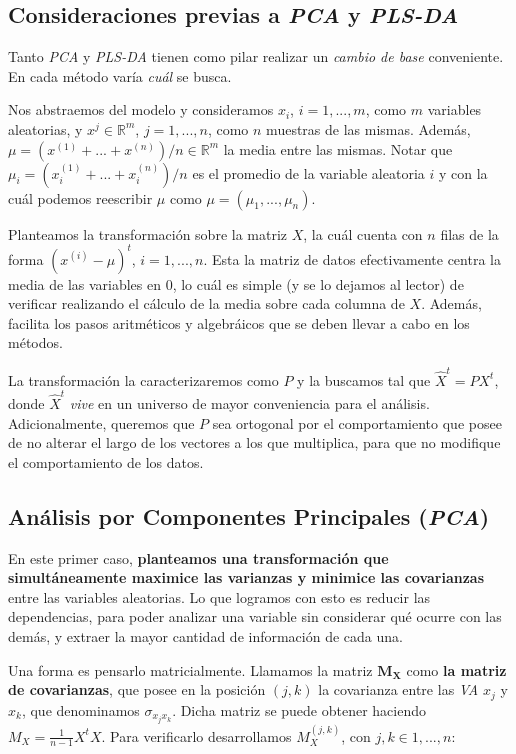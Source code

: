 \subsection{Consideraciones previas a \textit{PCA} y \textit{PLS-DA}}\label{intro_consideraciones}

Tanto \textit{PCA} y \textit{PLS-DA} tienen como pilar realizar un \textit{cambio de base} conveniente. En cada m\'etodo var\'ia \textit{cu\'al} se busca. 

Nos abstraemos del modelo y consideramos $x_{i}$, $i = 1, ..., m$, como $m$ variables aleatorias, y $x^{j} \in \mathbb{R}^m$, $j = 1, ..., n$, como $n$ muestras de las mismas. Adem\'as, $\mu = (x^{(1)} + ... + x^{(n)}) / n \in \mathbb{R}^{m}$ la media entre las mismas. Notar que $\mu_{i} = (x^{(1)}_{i} + ... + x^{(n)}_{i}) / n$ es el promedio de la variable aleatoria $i$ y con la cu\'al podemos reescribir $\mu$ como $\mu = (\mu_{1}, ..., \mu_{n})$.

Planteamos la transformaci\'on sobre la matriz $X$, la cu\'al cuenta con $n$ filas de la forma $(x^{(i)} - \mu)^t$, $i = 1, ..., n$. Esta la matriz de datos efectivamente centra la media de las variables en $0$, lo cu\'al es simple (y se lo dejamos al lector) de verificar realizando el c\'alculo de la media sobre cada columna de $X$. Adem\'as, facilita los pasos aritm\'eticos y algebr\'aicos que se deben llevar a cabo en los m\'etodos.

La transformaci\'on la caracterizaremos como $P$ y la buscamos tal que $\hat{X}^{t} = PX^{t}$, donde $\hat{X}^{t}$ \textit{vive} en un universo de mayor conveniencia para el an\'alisis. Adicionalmente, queremos que $P$ sea ortogonal por el comportamiento que posee de no alterar el largo de los vectores a los que multiplica, para que no modifique el comportamiento de los datos.

\subsection{An\'alisis por Componentes Principales (\textit{PCA})} \label{intro_PCA}

En este primer caso, \textbf{planteamos una transformaci\'on que simult\'aneamente maximice las varianzas y minimice las covarianzas} entre las variables aleatorias. Lo que logramos con esto es reducir las dependencias, para poder analizar una variable sin considerar qu\'e ocurre con las dem\'as, y extraer la mayor cantidad de informaci\'on de cada una.

Una forma es pensarlo matricialmente. Llamamos la matriz $\mathbf{M_{X}}$ como \textbf{la matriz de covarianzas}, que posee en la posici\'on $(j, k)$ la covarianza entre las \textit{VA} $x_{j}$ y $x_{k}$, que denominamos $\sigma_{x_{j}x_{k}}$. Dicha matriz se puede obtener haciendo $M_{X} = \frac{1}{n - 1}X^{t}X$. Para verificarlo desarrollamos  $M_{X}^{(j,k)}$, con $j,k \in {1, ..., n}$: \\

